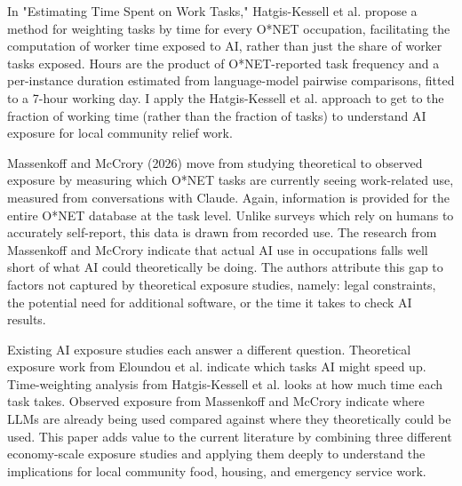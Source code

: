 In "Estimating Time Spent on Work Tasks," Hatgis-Kessell et al. propose a method for weighting tasks by time for every O*NET occupation, facilitating the computation of worker time exposed to AI, rather than just the share of worker tasks exposed. Hours are the product of O*NET-reported task frequency and a per-instance duration estimated from language-model pairwise comparisons, fitted to a 7-hour working day. I apply the Hatgis-Kessell et al. approach to get to the fraction of working time (rather than the fraction of tasks) to understand AI exposure for local community relief work.

Massenkoff and McCrory (2026) move from studying theoretical to observed exposure by measuring which O*NET tasks are currently seeing work-related use, measured from conversations with Claude. Again, information is provided for the entire O*NET database at the task level. Unlike surveys which rely on humans to accurately self-report, this data is drawn from recorded use. The research from Massenkoff and McCrory indicate that actual AI use in occupations falls well short of what AI could theoretically be doing. The authors attribute this gap to factors not captured by theoretical exposure studies, namely: legal constraints, the potential need for additional software, or the time it takes to check AI results.

Existing AI exposure studies each answer a different question. Theoretical exposure work from Eloundou et al. indicate which tasks AI might speed up. Time-weighting analysis from Hatgis-Kessell et al. looks at how much time each task takes. Observed exposure from Massenkoff and McCrory indicate where LLMs are already being used compared against where they theoretically could be used. This paper adds value to the current literature by combining three different economy-scale exposure studies and applying them deeply to understand the implications for local community food, housing, and emergency service work.
